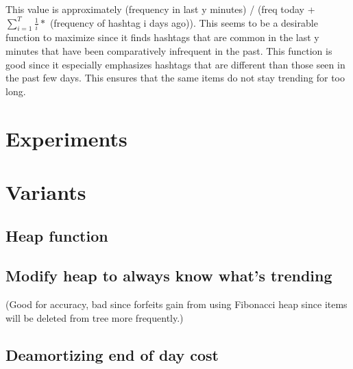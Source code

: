 \documentclass[a4paper,12pt]{article}
\begin{document}
This value is approximately (frequency in last y minutes) / (freq today + $\sum\limits_{i=1}^T \frac{1}{i} *$ (frequency of hashtag i days ago)).
This seems to be a desirable function to maximize since it finds hashtags that are common in the last y minutes that have been comparatively infrequent in the past.  This function is good since it especially emphasizes hashtags that are different than those seen in the past few days.  This ensures that the same items do not stay trending for too long. 


\section{Experiments}

\section{Variants}

\subsection{Heap function}

\subsection{Modify heap to always know what's trending}

(Good for accuracy, bad since forfeits gain from using Fibonacci heap since items will be deleted from tree more frequently.)

\subsection{Deamortizing end of day cost}
\end{document}
